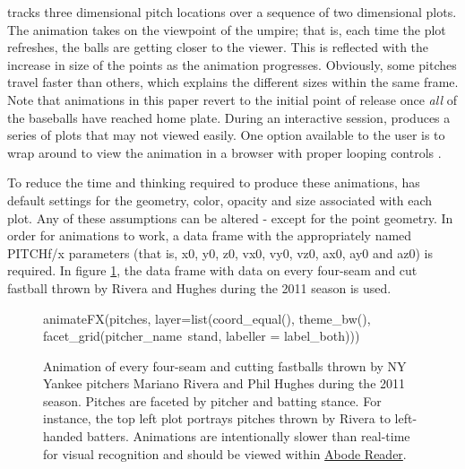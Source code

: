 \begin{article}
 tracks three dimensional pitch locations over a
sequence of two dimensional plots. The animation takes on the viewpoint
of the umpire; that is, each time the plot refreshes, the balls are
getting closer to the viewer. This is reflected with the increase
in size of the points as the animation progresses. Obviously, some
pitches travel faster than others, which explains the different sizes
within the same frame. Note that animations in this paper revert to
the initial point of release once \emph{all} of the baseballs have
reached home plate. During an interactive session, 
produces a series of plots that may not viewed easily. One option
available to the user is to wrap  around
 to view the animation in a browser with proper looping
controls \citet{animation}.

To reduce the time and thinking required to produce these animations,
 has default settings for the geometry, color, opacity
and size associated with each plot. Any of these assumptions can be
altered - except for the point geometry. In order for animations to
work, a data frame with the appropriately named PITCHf/x parameters
(that is, x0, y0, z0, vx0, vy0, vz0, ax0, ay0 and az0) is required.
In figure \ref{fig:animate1}, the data frame  with
data on every four-seam and cut fastball thrown by Rivera and Hughes
during the 2011 season is used.

\begin{figure}[h]
\begin{Schunk}
\begin{Sinput}
animateFX(pitches, layer=list(coord_equal(), theme_bw(),
	facet_grid(pitcher_name~stand, labeller = label_both)))
\end{Sinput}

\end{Schunk}


\caption{\label{fig:animate1}Animation of every four-seam and cutting fastballs
thrown by NY Yankee pitchers Mariano Rivera and Phil Hughes during
the 2011 season. Pitches are faceted by pitcher and batting stance.
For instance, the top left plot portrays pitches thrown by Rivera
to left-handed batters. Animations are intentionally slower than real-time
for visual recognition and should be viewed within \protect\href{http://get.adobe.com/reader/}{Abode Reader}.
\citet{knitr}}
\end{figure}



\end{article}
